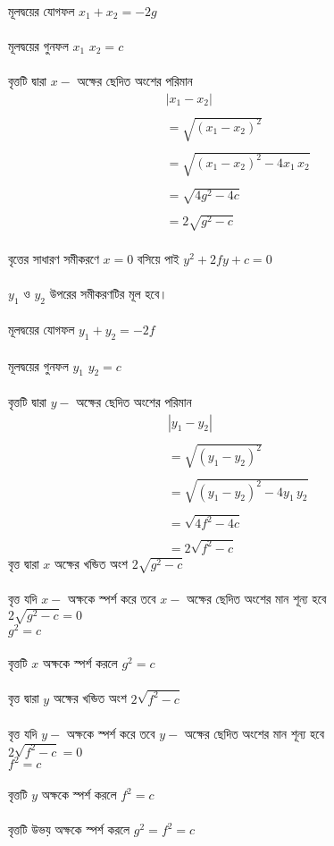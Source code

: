 \documentclass{article}
\begin{document}
\\
মূলদ্বয়ের যোগফল $x_1+x_2=-2g$\\
\\
মূলদ্বয়ের গুনফল $x_1\,\,x_2=c$\\
\\
বৃত্তটি দ্বারা $x-$ অক্ষের ছেদিত অংশের পরিমান \\ 
\begin{align*}
	&|x_1-x_2|\\
	\\
	&=\sqrt{(x_1-x_2)^2}\\
	\\
	&=\sqrt{(x_1-x_2)^2-4x_1\,x_2}\\
	\\
	&=\sqrt{4g^2-4c}\\
	\\
	&=2\sqrt{g^2-c}	
\end{align*} 
\\
বৃত্তের সাধারণ সমীকরণে $x=0$ বসিয়ে পাই $y^2+2fy+c=0$\\
\\
$y_1$ ও $y_2$ উপরের সমীকরণটির মূল হবে। \\
\\
মূলদ্বয়ের যোগফল $y_1+y_2=-2f$\\
\\
মূলদ্বয়ের গুনফল $y_1\,\,y_2=c$\\
\\
বৃত্তটি দ্বারা $y-$ অক্ষের ছেদিত অংশের পরিমান \\ 
\begin{align*}
	&|y_1-y_2|\\
	\\
	&=\sqrt{(y_1-y_2)^2}\\
	\\
	&=\sqrt{(y_1-y_2)^2-4y_1\,y_2}\\
	\\
	&=\sqrt{4f^2-4c}\\
	\\
	&=2\sqrt{f^2-c}	
\end{align*} 
বৃত্ত দ্বারা $x$ অক্ষের খন্ডিত অংশ	$2\sqrt{g^2-c}$\\
\\
বৃত্ত যদি $x-$ অক্ষকে স্পর্শ করে তবে $x-$ অক্ষের ছেদিত অংশের মান শূন্য হবে  \\
$2\sqrt{g^2-c}=0$\\
$g^2=c$\\
\\
বৃত্তটি  $x$ অক্ষকে স্পর্শ করলে  $g^2=c$\\
\\
বৃত্ত দ্বারা $y$ অক্ষের খন্ডিত অংশ	$2\sqrt{f^2-c}$\\
\\
বৃত্ত যদি $y-$ অক্ষকে স্পর্শ করে তবে $y-$ অক্ষের ছেদিত অংশের মান শূন্য হবে\\
$2\sqrt{f^2-c}=0$\\
$f^2=c$\\
\\ 
বৃত্তটি  $y$ অক্ষকে স্পর্শ করলে  $f^2=c$\\
\\
বৃত্তটি উভয় অক্ষকে স্পর্শ করলে 	$g^2=f^2=c$\\ 
\end{document}
